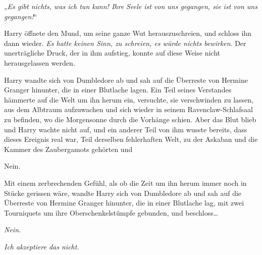 „\emph{Es gibt nichts, was ich tun kann! Ihre Seele ist von uns gegangen, sie ist von uns gegangen!}“

Harry öffnete den Mund, um seine ganze Wut herauszuschreien, und schloss ihn dann wieder. \emph{Es hatte keinen Sinn, zu schreien, es würde nichts bewirken}. Der unerträgliche Druck, der in ihm aufstieg, konnte auf diese Weise nicht herausgelassen werden.

Harry wandte sich von Dumbledore ab und sah auf die Überreste von Hermine Granger hinunter, die in einer Blutlache lagen. Ein Teil seines Verstandes hämmerte auf die Welt um ihn herum ein, versuchte, sie verschwinden zu lassen, aus dem Albtraum aufzuwachen und sich wieder in seinem Ravenclaw-Schlafsaal zu befinden, wo die Morgensonne durch die Vorhänge schien. Aber das Blut blieb und Harry wachte nicht auf, und ein anderer Teil von ihm wusste bereits, dass dieses Ereignis real war, Teil derselben fehlerhaften Welt, zu der Askaban und die Kammer des Zaubergamots gehörten und

Nein.

Mit einem zerbrechenden Gefühl, als ob die Zeit um ihn herum immer noch in Stücke gerissen wäre, wandte Harry sich von Dumbledore ab und sah auf die Überreste von Hermine Granger hinunter, die in einer Blutlache lag, mit zwei Tourniquets um ihre Oberschenkelstümpfe gebunden, und beschloss…

\emph{Nein.}

\emph{Ich akzeptiere das nicht.}

